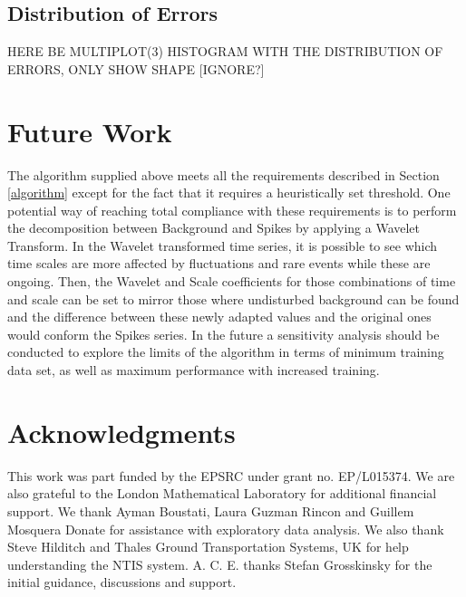 \documentclass[conference]{IEEEtran}
\begin{document}
\subsection{Distribution of Errors}
HERE BE MULTIPLOT(3) HISTOGRAM WITH THE DISTRIBUTION OF ERRORS, ONLY SHOW SHAPE [IGNORE?]
\section{Future Work}
The algorithm supplied above meets all the requirements described in Section \ref{algorithm} except for the fact that it requires a heuristically set threshold. 
One potential way of reaching total compliance with these requirements is to perform the decomposition between Background and Spikes by applying a Wavelet Transform. 
In the Wavelet transformed time series, it is possible to see which time scales are more affected by fluctuations and rare events while these are ongoing. 
Then, the Wavelet and Scale coefficients for those combinations of time and scale can be set to mirror those where undisturbed background can be found and the difference between these newly adapted values and the original ones would conform the Spikes series.
In the future a sensitivity analysis should be conducted to explore the limits of the algorithm in terms of minimum training data set, as well as maximum performance with increased training.
\section*{Acknowledgments}
This work was part funded by the EPSRC under grant no. EP/L015374. 
We are also grateful to the London Mathematical Laboratory for additional financial support. 
We thank Ayman Boustati, Laura Guzman Rincon and Guillem Mosquera Donate for assistance with exploratory data analysis. 
We also thank Steve Hilditch and Thales Ground Transportation Systems, UK for help understanding the NTIS system.  
A. C. E. thanks Stefan Grosskinsky for the initial guidance, discussions and support.
\end{document}
